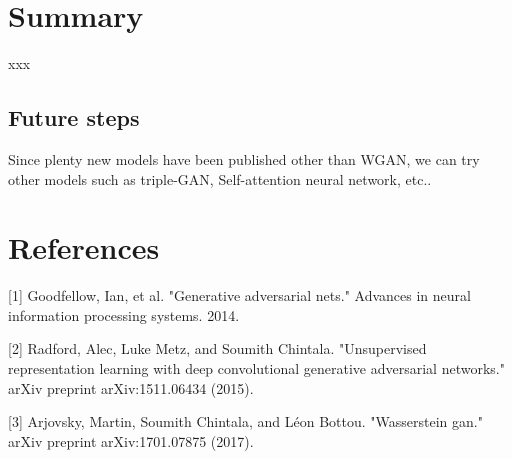 \documentclass{article}
\begin{document}
\section{Summary}

xxx

\subsection{Future steps}

Since plenty new models have been published other than WGAN, we can try other models such as triple-GAN, Self-attention neural network, etc..

\section*{References}

[1] Goodfellow, Ian, et al. "Generative adversarial nets." Advances in neural information processing systems. 2014.

[2] Radford, Alec, Luke Metz, and Soumith Chintala. "Unsupervised representation learning with deep convolutional generative adversarial networks." arXiv preprint arXiv:1511.06434 (2015).

[3] Arjovsky, Martin, Soumith Chintala, and Léon Bottou. "Wasserstein gan." arXiv preprint arXiv:1701.07875 (2017).
\end{document}
